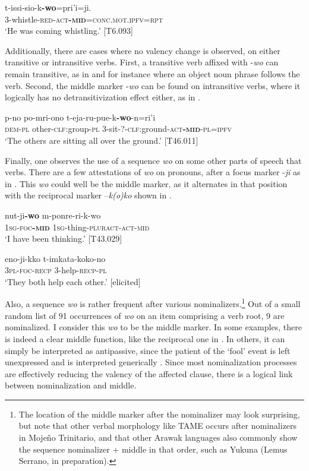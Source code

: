 \documentclass[output=paper]{langscibook}
\begin{document}
\ea
\label{ex:Rose:43}
\gll t-issi-sio-k\textbf{-wo}=pri'i=ji. \\
3-whistle-\textsc{red}-\textsc{act}\textbf{\textsc{-mid}}\textsc{=conc.mot.ipfv=rpt}\\
\glt ‘He was coming whistling.’ [T6.093]
\z


Additionally, there are cases where no valency change is observed, on either transitive or intransitive verbs. First, a transitive verb affixed with -\textit{wo} can remain transitive, as in  and  for instance where an object noun phrase follows the verb. Second, the middle marker -\textit{wo} can be found on intransitive verbs, where it logically has no detransitivization effect either, as in .


\ea
\label{ex:Rose:44}
\gll p-no po-mri-ono t-eja-ru-pue-k\textbf{-wo}-n=ri'i \\
\textsc{dem-pl} other-\textsc{clf}:group-\textsc{pl} 3-sit-\textsc{?-clf}:ground-\textsc{act\textbf{-mid}-pl=ipfv}\\
\glt ‘The others are sitting all over the ground.’ [T46.011]
\z


Finally, one observes the use of a sequence \textit{wo} on some other parts of speech that verbs. There are a few attestations of \textit{wo} on pronouns, after a focus marker -\textit{ji} as in . This \textit{wo} could well be the middle marker, as it alternates in that position with the reciprocal marker –\textit{k(o)ko} shown in .


\ea
\label{ex:Rose:45}
\gll nut-ji\textbf{-wo} m-ponre-ri-k-wo \\
\textsc{1sg-foc\textbf{-mid}} \textsc{1sg}-thing-\textsc{pluract-act-mid}\\
\glt ‘I have been thinking.’ [T43.029]
\z

\ea
\label{ex:Rose:46}
\gll eno-ji-kko t-imkata-koko-no \\
\textsc{3pl-foc-recp} 3-help-\textsc{recp-pl}\\
\glt ‘They both help each other.’ [elicited]
\z


Also, a sequence \textit{wo} is rather frequent after various nominalizers.\footnote{The location of the middle marker after the nominalizer may look surprising, but note that other verbal morphology like TAME occurs after nominalizers in Mojeño Trinitario, and that other Arawak languages also commonly show the sequence nominalizer + middle in that order, such as Yukuna (Lemus Serrano, in preparation).} Out of a small random list of 91 occurrences of \textit{wo} on an item comprising a verb root, 9 are nominalized. I consider this \textit{wo} to be the middle marker. In some examples, there is indeed a clear middle function, like the reciprocal one in . In others, it can simply be interpreted as antipassive, since the patient of the ‘fool’ event is left unexpressed and is interpreted generically . Since most nominalization processes are effectively reducing the valency of the affected clause, there is a logical link between nominalization and middle.
\end{document}
